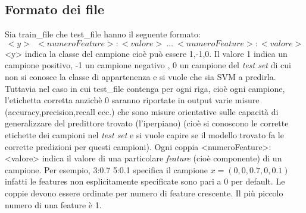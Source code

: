 \subsection{Formato dei file}
Sia train\_file che test\_file hanno il seguente formato:
\begin{equation*}
<y>\:\: <numeroFeature>:<valore> \:\dots\: <numeroFeature>:<valore>
\end{equation*}
<y> indica la classe del campione cioè può essere 1,-1,0. Il valore 1 indica un campione positivo, -1 un campione negativo , 0 un campione del \textit{test set} di cui non si conosce la classe di appartenenza e si vuole che sia \ac{SVM} a predirla. Tuttavia nel caso in cui test\_file contenga per ogni riga, cioè ogni campione, l'etichetta corretta anzichè 0  saranno riportate in output varie misure (accuracy,precision,recall ecc.) che sono misure orientative sulle capacità di generalizzare del predittore trovato (l'iperpiano) (cioè si conoscono le corrette etichette dei campioni nel \textit{test set} e si vuole capire se il modello trovato fa le corrette predizioni per questi campioni). Ogni coppia <numeroFeature>:<valore> indica il valore di una particolare \textit{feature} (cioè componente) di un campione. Per esempio, 3:0.7 5:0.1  specifica il campione $x=(0,0,0.7,0,0.1)$ infatti le features non esplicitamente specificate sono pari a 0 per default. Le coppie devono essere ordinate per numero di feature crescente. Il più piccolo numero di una feature è 1.

